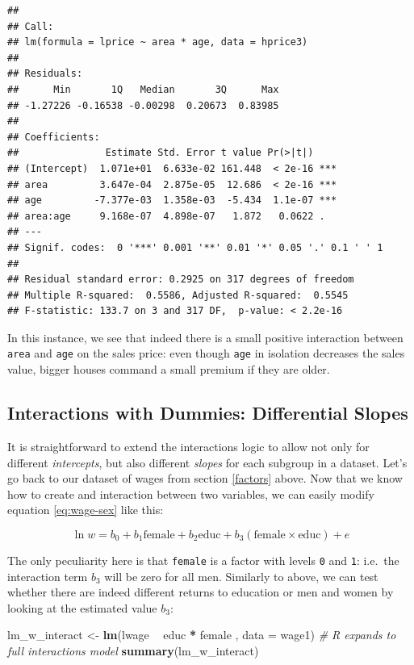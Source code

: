 \documentclass[]{book}
\newenvironment{Shaded}{\begin{snugshade}}{\end{snugshade}}
\newcommand{\KeywordTok}[1]{\textcolor[rgb]{0.13,0.29,0.53}{\textbf{#1}}}
\newcommand{\DataTypeTok}[1]{\textcolor[rgb]{0.13,0.29,0.53}{#1}}
\newcommand{\StringTok}[1]{\textcolor[rgb]{0.31,0.60,0.02}{#1}}
\newcommand{\CommentTok}[1]{\textcolor[rgb]{0.56,0.35,0.01}{\textit{#1}}}
\newcommand{\OperatorTok}[1]{\textcolor[rgb]{0.81,0.36,0.00}{\textbf{#1}}}
\newcommand{\NormalTok}[1]{#1}
\begin{document}
\begin{verbatim}
## 
## Call:
## lm(formula = lprice ~ area * age, data = hprice3)
## 
## Residuals:
##      Min       1Q   Median       3Q      Max 
## -1.27226 -0.16538 -0.00298  0.20673  0.83985 
## 
## Coefficients:
##               Estimate Std. Error t value Pr(>|t|)    
## (Intercept)  1.071e+01  6.633e-02 161.448  < 2e-16 ***
## area         3.647e-04  2.875e-05  12.686  < 2e-16 ***
## age         -7.377e-03  1.358e-03  -5.434  1.1e-07 ***
## area:age     9.168e-07  4.898e-07   1.872   0.0622 .  
## ---
## Signif. codes:  0 '***' 0.001 '**' 0.01 '*' 0.05 '.' 0.1 ' ' 1
## 
## Residual standard error: 0.2925 on 317 degrees of freedom
## Multiple R-squared:  0.5586, Adjusted R-squared:  0.5545 
## F-statistic: 133.7 on 3 and 317 DF,  p-value: < 2.2e-16
\end{verbatim}

In this instance, we see that indeed there is a small positive
interaction between \texttt{area} and \texttt{age} on the sales price:
even though \texttt{age} in isolation decreases the sales value, bigger
houses command a small premium if they are older.

\subsection{Interactions with Dummies: Differential
Slopes}\label{interactions-with-dummies-differential-slopes}

It is straightforward to extend the interactions logic to allow not only
for different \emph{intercepts}, but also different \emph{slopes} for
each subgroup in a dataset. Let's go back to our dataset of wages from
section \ref{factors} above. Now that we know how to create and
interaction between two variables, we can easily modify equation
\eqref{eq:wage-sex} like this:

\begin{equation}
\ln w = b_0 + b_1 \text{female} + b_2 \text{educ} + b_3 (\text{female} \times \text{educ}) + e \label{eq:wage-sex2}
\end{equation}

The only peculiarity here is that \texttt{female} is a factor with
levels \texttt{0} and \texttt{1}: i.e.~the interaction term \(b_3\) will
be zero for all men. Similarly to above, we can test whether there are
indeed different returns to education or men and women by looking at the
estimated value \(b_3\):

\begin{Shaded}
\begin{Highlighting}[]
\NormalTok{lm_w_interact <-}\StringTok{ }\KeywordTok{lm}\NormalTok{(lwage }\OperatorTok{~}\StringTok{ }\NormalTok{educ }\OperatorTok{*}\StringTok{ }\NormalTok{female , }\DataTypeTok{data =}\NormalTok{ wage1)  }\CommentTok{# R expands to full interactions model}
\KeywordTok{summary}\NormalTok{(lm_w_interact)}
\end{Highlighting}
\end{Shaded}
\end{document}
